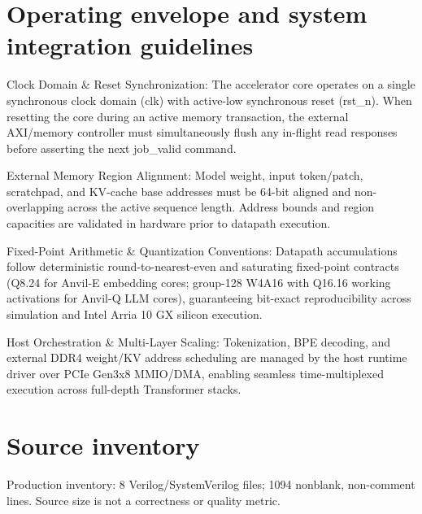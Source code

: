 \documentclass[11pt,a4paper]{article}
\begin{document}
\section{Operating envelope and system integration guidelines}

Clock Domain \& Reset Synchronization: The accelerator core operates on a single synchronous clock domain (\allowbreak{}clk)\allowbreak{} with active-low synchronous reset (\allowbreak{}rst\_\allowbreak{}n)\allowbreak{}. When resetting the core during an active memory transaction,\allowbreak{} the external AXI/\allowbreak{}memory controller must simultaneously flush any in-flight read responses before asserting the next job\_\allowbreak{}valid command.


External Memory Region Alignment: Model weight,\allowbreak{} input token/\allowbreak{}patch,\allowbreak{} scratchpad,\allowbreak{} and KV-cache base addresses must be 64-bit aligned and non-overlapping across the active sequence length. Address bounds and region capacities are validated in hardware prior to datapath execution.


Fixed-Point Arithmetic \& Quantization Conventions: Datapath accumulations follow deterministic round-to-nearest-even and saturating fixed-point contracts (\allowbreak{}Q8.24 for Anvil-E embedding cores; group-128 W4A16 with Q16.16 working activations for Anvil-Q LLM cores)\allowbreak{},\allowbreak{} guaranteeing bit-exact reproducibility across simulation and Intel Arria 10 GX silicon execution.


Host Orchestration \& Multi-Layer Scaling: Tokenization,\allowbreak{} BPE decoding,\allowbreak{} and external DDR4 weight/\allowbreak{}KV address scheduling are managed by the host runtime driver over PCIe Gen3x8 MMIO/\allowbreak{}DMA,\allowbreak{} enabling seamless time-multiplexed execution across full-depth Transformer stacks.


\appendix{}\section{Source inventory}

Production inventory: 8 Verilog/\allowbreak{}SystemVerilog files; 1094 nonblank,\allowbreak{} non-comment lines. Source size is not a correctness or quality metric.
\end{document}

